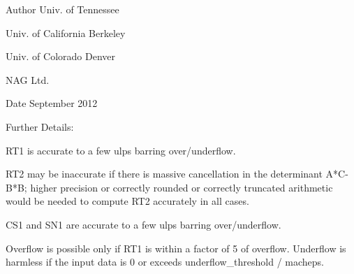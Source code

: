 \begin{DoxyAuthor}{Author}
Univ. of Tennessee 

Univ. of California Berkeley 

Univ. of Colorado Denver 

N\+A\+G Ltd. 
\end{DoxyAuthor}
\begin{DoxyDate}{Date}
September 2012 
\end{DoxyDate}
\begin{DoxyParagraph}{Further Details\+: }
\begin{DoxyVerb}  RT1 is accurate to a few ulps barring over/underflow.

  RT2 may be inaccurate if there is massive cancellation in the
  determinant A*C-B*B; higher precision or correctly rounded or
  correctly truncated arithmetic would be needed to compute RT2
  accurately in all cases.

  CS1 and SN1 are accurate to a few ulps barring over/underflow.

  Overflow is possible only if RT1 is within a factor of 5 of overflow.
  Underflow is harmless if the input data is 0 or exceeds
     underflow_threshold / macheps.\end{DoxyVerb}
 
\end{DoxyParagraph}

